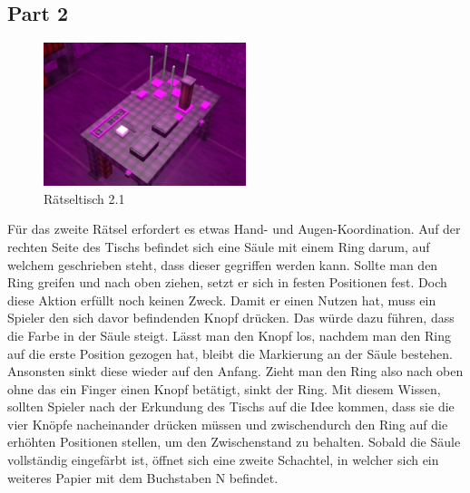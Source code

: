 \subsection{Part 2}
\begin{figure}
	\vspace*{-1cm}
	\includegraphics[width=5.9cm]{Pictures/Tisch2}
	\caption{Rätseltisch 2.1}
	\vspace*{0cm}
	\label{fig:tisch2}
\end{figure}
Für das zweite Rätsel erfordert es etwas Hand- und Augen-Koordination. Auf der rechten Seite des Tischs befindet sich eine Säule mit einem Ring darum, auf welchem geschrieben steht, dass dieser gegriffen werden kann. Sollte man den Ring greifen und nach oben ziehen, setzt er sich in festen Positionen fest. Doch diese Aktion erfüllt noch keinen Zweck. Damit er einen Nutzen hat, muss ein Spieler den sich davor befindenden Knopf drücken. Das würde dazu führen, dass die Farbe in der Säule steigt. Lässt man den Knopf los, nachdem man den Ring auf die erste Position gezogen hat, bleibt die Markierung an der Säule bestehen. Ansonsten sinkt diese wieder auf den Anfang. Zieht man den Ring also nach oben ohne das ein Finger einen Knopf betätigt, sinkt der Ring. Mit diesem Wissen, sollten Spieler nach der Erkundung des Tischs auf die Idee kommen, dass sie die vier Knöpfe nacheinander drücken müssen und zwischendurch den Ring auf die erhöhten Positionen stellen, um den Zwischenstand zu behalten. Sobald die Säule vollständig eingefärbt ist, öffnet sich eine zweite Schachtel, in welcher sich ein weiteres Papier mit dem Buchstaben N befindet.
